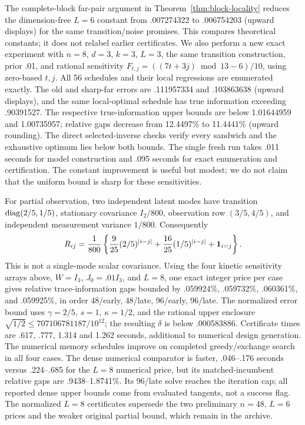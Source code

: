 The complete-block far-pair argument in Theorem~\ref{thm:block-locality}
reduces the dimension-free $L=6$ constant from .007274322 to .006754203
(upward displays) for the same transition/noise promises. This compares
theoretical constants; it does not relabel earlier certificates.
We also perform a new exact experiment with $n=8$, $d=3$, $k=3$, $L=3$,
the same transition construction, prior .01, and rational sensitivity
$F_{t,j}=((7t+3j)\bmod13-6)/10$, using zero-based $t,j$.
All 56 schedules and their local regressions are enumerated exactly. The
old and sharp-far errors are .111957334 and .103863638 (upward displays),
and the same local-optimal schedule has true information exceeding .90391527.
The respective true-information upper bounds are below 1.01644959 and
1.00735957; relative gaps decrease from 12.4497\% to 11.4441\% (upward
rounding). The direct selected-inverse checks verify every sandwich and the
exhaustive optimum lies below both bounds. The single fresh run takes .011
seconds for model construction and .095 seconds for exact enumeration and
certification. The constant improvement is useful but modest; we do not claim
that the uniform bound is sharp for these sensitivities.

For partial observation, two independent latent modes have transition
$\operatorname{diag}(2/5,1/5)$, stationary covariance $I_2/800$, observation row
$(3/5,4/5)$, and independent measurement variance $1/800$. Consequently
\begin{equation}\label{eq:two-mode-probe}
 R_{ij}=\frac1{800}\left\{
   \frac9{25}(2/5)^{|i-j|}+\frac{16}{25}(1/5)^{|i-j|}+\mathbf 1_{i=j}\right\}.
\end{equation}
This is not a single-mode scalar covariance. Using the four kinetic
sensitivity arrays above, $W=I_3$, $J_0=.01I_3$, and $L=8$, one exact
integer price per case gives relative trace-information gaps bounded by
.059924\%, .059732\%, .060361\%, and .059925\%, in order
48/early, 48/late, 96/early, 96/late. The normalized error bound uses
$\gamma=2/5$, $s=1$, $\kappa=1/2$, and the rational upper enclosure
$\sqrt{1/2}\le707106781187/10^{12}$; the resulting $\delta$ is below
.000583886. Certificate times are .617, .777, 1.314 and 1.262 seconds,
additional to numerical design generation.
The numerical memory schedules improve on completed greedy/exchange search
in all four cases. The dense numerical comparator is faster, .046--.176
seconds versus .224--.685 for the $L=8$ numerical price, but its matched-incumbent
relative gaps are .9438--1.8741\%. Its 96/late solve reaches the iteration cap;
all reported dense upper bounds come from evaluated tangents, not a success
flag. The normalized $L=8$ certificates supersede the two preliminary
$n=48$, $L=6$ prices and the weaker original partial bound, which remain in
the archive.

